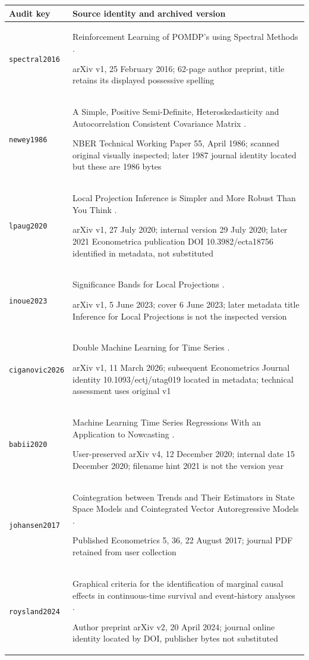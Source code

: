 \begin{longtable}{P{32mm}P{112mm}}
\toprule Audit key & Source identity and archived version\\\midrule\endhead
{\scriptsize\texttt{spectral2016}} & Reinforcement Learning of POMDP's using Spectral Methods \citep{spectral2016}.\par arXiv v1, 25 February 2016; 62-page author preprint, title retains its displayed possessive spelling\\
{\scriptsize\texttt{newey1986}} & A Simple, Positive Semi-Definite, Heteroskedasticity and Autocorrelation Consistent Covariance Matrix \citep{newey1986}.\par NBER Technical Working Paper 55, April 1986; scanned original visually inspected; later 1987 journal identity located but these are 1986 bytes\\
{\scriptsize\texttt{lpaug2020}} & Local Projection Inference is Simpler and More Robust Than You Think \citep{lpaug2020}.\par arXiv v1, 27 July 2020; internal version 29 July 2020; later 2021 Econometrica publication DOI 10.3982/ecta18756 identified in metadata, not substituted\\
{\scriptsize\texttt{inoue2023}} & Significance Bands for Local Projections \citep{inoue2023}.\par arXiv v1, 5 June 2023; cover 6 June 2023; later metadata title Inference for Local Projections is not the inspected version\\
{\scriptsize\texttt{ciganovic2026}} & Double Machine Learning for Time Series \citep{ciganovic2026}.\par arXiv v1, 11 March 2026; subsequent Econometrics Journal identity 10.1093/ectj/utag019 located in metadata; technical assessment uses original v1\\
{\scriptsize\texttt{babii2020}} & Machine Learning Time Series Regressions With an Application to Nowcasting \citep{babii2020}.\par User-preserved arXiv v4, 12 December 2020; internal date 15 December 2020; filename hint 2021 is not the version year\\
{\scriptsize\texttt{johansen2017}} & Cointegration between Trends and Their Estimators in State Space Models and Cointegrated Vector Autoregressive Models \citep{johansen2017}.\par Published Econometrics 5, 36, 22 August 2017; journal PDF retained from user collection\\
{\scriptsize\texttt{roysland2024}} & Graphical criteria for the identification of marginal causal effects in continuous-time survival and event-history analyses \citep{roysland2024}.\par Author preprint arXiv v2, 20 April 2024; journal online identity located by DOI, publisher bytes not substituted\\

\end{longtable}
